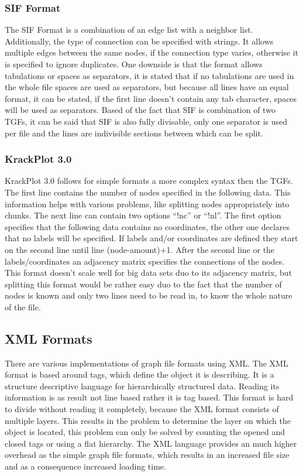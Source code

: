 		

\subsubsection{SIF Format}
The SIF Format is a combination of an edge list with a neighbor list. Additionally, the type of connection can be specified with strings. It allows multiple edges between the same nodes, if the connection type varies, otherwise it is specified to ignore duplicates. One downside is that the format allows tabulations or spaces as separators, it is stated that if no tabulations are used in the whole file spaces are used as separators, but because all lines have an equal format, it can be stated, if the first line doesn't contain any tab character, spaces will be used as separators. Based of the fact that SIF is combination of two TGFs, it can be said that SIF is also fully divisable, only one separator is used per file and the lines are indivisible sections between which can be split. \cite{TheCytoscapeConsortium.2017}

\subsubsection{KrackPlot 3.0}
KrackPlot 3.0 follows for simple formats a more complex syntax then the TGFs. The first line contains the number of nodes specified in the following data. This information helps with various problems, like splitting nodes appropriately into chunks. The next line can contain two options “!nc” or “!nl”. The first option specifies that the following data contains no coordinates, the other one declares that no labels will be specified. If labels and/or coordinates are defined they start on the second line until line (node-amount)+1. After the second line or the labels/coordinates an adjacency matrix specifies the connections of the nodes.
This format doesn't scale well for big data sets duo to its adjacency matrix, but splitting this format would be rather easy duo to the fact that the number of nodes is known and only two lines need to be read in, to know the whole nature of the file.\cite{D.KrackhardtJ.BlytheC.McGrath.4.12.2001}\\ 

\subsection{XML Formats}
There are various implementations of graph file formats using XML. The XML format is based around tags, which define the object it is describing. It is a structure descriptive language for hierarchically structured data. Reading its information is as result not line based rather it is tag based. This format is hard to divide without reading it completely, because the XML format consists of multiple layers. This results in the problem to determine the layer on which the object is located, this problem can only be solved by counting the opened and closed tags or using a flat hierarchy.\cite{bray1997extensible,Roughan.10.03.2015}
The XML language provides an much higher overhead as the simple graph file formats, which results in an increased file size and as a consequence increased loading time.

